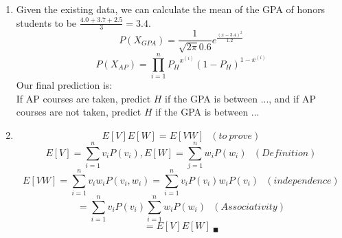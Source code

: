 \documentclass{article}
\begin{document}
\begin{enumerate}
\begin{enumerate}
                    \begin{tabular}{l | r}
                        \begin{tabular}{l c c}
                             & First Child \\
                             & B & B \\
                             & B & G \\
                            $\rightarrow$ & G & B \\
                            $\rightarrow$ & G & G
                        \end{tabular}
                        &
                        \begin{tabular}{c c r}
                            & Second Child \\
                            B & B & \\
                            B & G & $\leftarrow$ \\
                            G & B & \\
                            G & G & $\leftarrow$
                        \end{tabular}
                    \end{tabular} \\
                    This results in two cases where one child is a girl, out of four
                    remaining cases, for a probability of $\frac{1}{2}$.
            \end{enumerate}
        \item
            Given the existing data, we can calculate the mean of the GPA of
            honors students to be $ \frac{4.0 + 3.7 + 2.5}{3} = 3.4 $.
            $$ P( X_{GPA} ) = \frac{1}{\sqrt{2 \pi} 0.6} e^{\frac{(x - 3.4)^2 }{1.2} }$$
            $$ P( X_{AP} ) = \prod\limits_{i = 1}^{n} {P_H}^{x^{(i)}}(1 - P_H)^{1 - x^{(i)}} $$
            Our final prediction is: \\
            If AP courses are taken, predict $H$ if the GPA is between ..., and
            if AP courses are not taken, predict $H$ if the GPA is between ... \\
        \item
            $$ E[V]E[W] = E[VW] \ \ \ (to\ prove)$$
            $$ E[V] = \sum_{i = 1}^{n} v_i P(v_i), E[W] = \sum_{j = 1}^{n} w_i P(w_i) \ \ \ (Definition)$$
            $$ E[VW] = \sum_{i = 1}^{n} v_iw_iP(v_i, w_i) = \sum_{i = 1}^{n} v_iP(v_i)w_iP(v_i) \ \ \ (independence)$$
            $$ = \sum_{i = 1}^{n} v_i P(v_i) \sum_{i = 1}^{n} w_i P(w_i) \ \ \ (Associativity)$$
            $$ = E[V]E[W]\ _\blacksquare$$
\end{enumerate}
\end{document}
